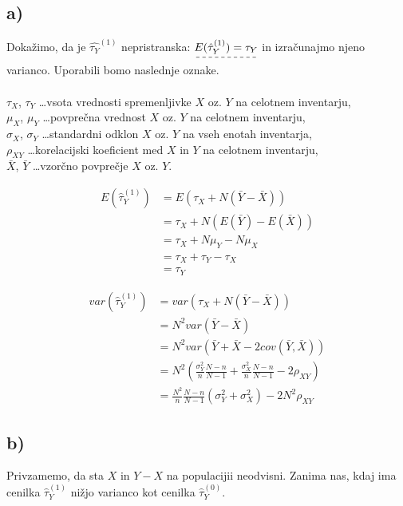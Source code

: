 \documentclass[A4paper, 11pt]{article}
\begin{document}
\subsection*{a)}
Dokažimo, da je $\hat{\tau_Y} ^ {(1)}$ nepristranska: $\dashuline{ E(\hat{\tau}_Y ^ {(1)}) = \tau_Y}$ in izračunajmo njeno varianco. Uporabili bomo naslednje oznake. \\
\\
$\tau_X$, $\tau_Y$ \ldots vsota vrednosti spremenljivke $X$ oz. $Y$ na celotnem inventarju, \\
$\mu_X$, $\mu_Y$ \ldots povprečna vrednost $X$ oz. $Y$ na celotnem inventarju, \\
$\sigma_X$, $\sigma_Y$ \ldots standardni odklon $X$ oz. $Y$ na vseh enotah inventarja, \\
$\rho_{XY}$ \ldots korelacijski koeficient med $X$ in $Y$ na celotnem inventarju, \\
$\bar{X}$, $\bar{Y}$ \ldots vzorčno povprečje $X$ oz. $Y$.


\[ 
\begin{split}
E(\hat{\tau}_Y ^ {(1)}) & = E(\tau_X + N (\bar{Y} - \bar{X})) \\
			       & = \tau_X  + N (E(\bar{Y}) - E(\bar{X})) \\
			       & = \tau_X + N \mu_Y - N \mu_X \\
			       & = \tau_X + \tau_Y - \tau_X \\
			       & = \tau_Y
\end{split}
\]

\[
\begin{split}
var(\hat{\tau}_Y ^ {(1)})  & = var(\tau_X + N (\bar{Y} - \bar{X})) \\
				& = N^2 var( \bar{Y} - \bar{X} ) \\
				& = N^2 var( \bar{Y} + \bar{X} - 2 cov(\bar{Y},\bar{X}) ) \\
				& = N^2 ( \frac{\sigma_Y^2}{n} \frac{N - n}{N - 1} + \frac{\sigma_X^2}{n} \frac{N - n}{N - 1} - 2\rho_{XY} ) \\
				&= \frac{N^2}{n} \frac{N - n}{N - 1} (\sigma_Y^2 + \sigma_X^2) - 2 N^2 \rho_{XY}
\end{split}
\]


\subsection*{b)}
Privzamemo, da sta $X$ in $Y - X$ na populacijii neodvisni. Zanima nas, kdaj ima cenilka $\hat{\tau}_Y ^ {(1)}$ nižjo varianco kot cenilka $\hat{\tau}_Y ^ {(0)}$.
\end{document}
